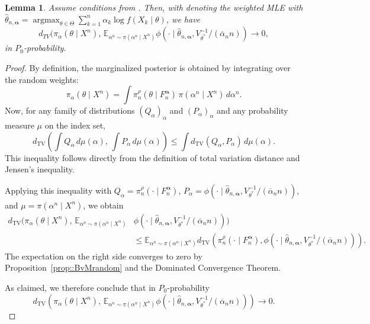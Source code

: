 \documentclass[11pt, oneside]{amsart}
\newtheorem{lemma}{Lemma}
\theoremstyle{definition}   %
\newcommand{\E}{\mathbb{E}}
\newcommand{\loss}{\rho}
\newcommand{\mposterior}{\pi_n^{\loss}}
\newcommand{\wempirical}{F_n^{\boldsymbol{\alpha}}}
\begin{document}
\begin{lemma}
\label{lemma::BvM-for-Reweighted-Posterior}
Assume conditions from . Then, with denoting the weighted MLE with $\hat{\theta}_{n, \boldsymbol{\alpha}} = \operatorname{argmax}_{\theta \in \Theta} \sum_{k=1}^n {\alpha_k} \log f(X_k \mid \theta) $, we have
    $$d_{TV} ( \pi_\alpha(\theta \mid X^n), \, \mathbb{E}_{\alpha^n \sim \pi(\alpha^n \mid X^n)} \phi(\cdot \mid \hat{\theta}_{n, \boldsymbol{\alpha}}, V_{\theta^*}^{-1} / (\overline{\alpha}_n n) ) \to 0,$$
    in $P_0$-probability.
\end{lemma}

\begin{proof}
    By definition, the marginalized posterior is obtained by integrating over the random weights:
    \[
        \pi_\alpha(\theta \mid X^n) 
        = \int \mposterior(\theta \mid \wempirical)\, \pi(\alpha^n \mid X^n)\, d\alpha^n.
    \]
    Now, for any family of distributions $(Q_\alpha)_{\alpha}$ and $(P_\alpha)_{\alpha}$ and any probability measure $\mu$ on the index set,
    \[
        d_{\mathrm{TV}}\!\left(\int Q_\alpha \, d\mu(\alpha), \, \int P_\alpha \, d\mu(\alpha)\right) 
        \leq \int d_{\mathrm{TV}}(Q_\alpha, P_\alpha) \, d\mu(\alpha).
    \]
    This inequality follows directly from the definition of total variation distance and Jensen’s inequality.  

    Applying this inequality with $Q_\alpha = \mposterior(\cdot \mid \wempirical)$, $P_\alpha = \phi(\cdot \mid \hat{\theta}_{n,\boldsymbol{\alpha}}, V_{\theta^*}^{-1}/(\overline{\alpha}_n n))$, and $\mu = \pi(\alpha^n \mid X^n)$, we obtain
    \[
    \begin{split}
        d_{\mathrm{TV}}\!\bigl ( \pi_\alpha(\theta \mid X^n), \,
        \E_{\alpha^n \sim \pi(\alpha^n \mid X^n)} & \phi(\cdot \mid \hat{\theta}_{n, \boldsymbol{\alpha}}, V_{\theta^*}^{-1}/(\overline{\alpha}_n n)) \bigr) \\
        & \leq \E_{\alpha^n \sim \pi(\alpha^n \mid X^n)} 
        d_{\mathrm{TV}}\!\left(\mposterior(\cdot \mid \wempirical), \phi(\cdot \mid \hat{\theta}_{n,\boldsymbol{\alpha}}, V_{\theta^*}^{-1}/(\overline{\alpha}_n n))\right).
    \end{split}
    \]
    The expectation on the right  side converges to zero by Proposition~\ref{prop::BvMrandom} and the Dominated Convergence Theorem.  

    As claimed, we therefore conclude that in $P_0$-probability
    \[
        d_{\mathrm{TV}}\!\left(\pi_\alpha(\theta \mid X^n), \,
        \E_{\alpha^n \sim \pi(\alpha^n \mid X^n)} \phi(\cdot \mid \hat{\theta}_{n, \boldsymbol{\alpha}}, V_{\theta^*}^{-1}/(\overline{\alpha}_n n)) \right) \to 0.
    \]
\end{proof}
\end{document}
